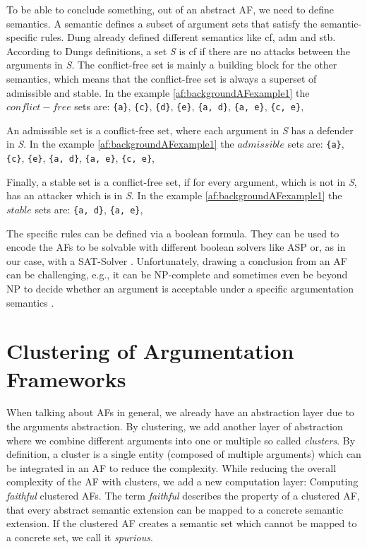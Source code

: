 To be able to conclude something, out of an abstract AF, we need to define semantics. A semantic defines a subset of argument sets that satisfy the semantic-specific rules. Dung already defined different semantics \cite{Dung1995-DUNOTA-2} like \ac{cf}, \ac{adm} and \ac{stb}. According to Dungs definitions, a set \textit{S} is \ac{cf} if there are no attacks between the arguments in \textit{S}. The conflict-free set is mainly a building block for the other semantics, which means that the conflict-free set is always a superset of admissible and stable. In the example \ref{af:backgroundAFexample1} the $conflict-free$ sets are:
\texttt{\{a\}},
\texttt{\{c\}},
\texttt{\{d\}},
\texttt{\{e\}},
\texttt{\{a, d\}},
\texttt{\{a, e\}},
\texttt{\{c, e\}},


An admissible set is a conflict-free set, where each argument in \textit{S} has a defender in \textit{S}. In the example \ref{af:backgroundAFexample1} the $admissible$ sets are:
\texttt{\{a\}},
\texttt{\{c\}},
\texttt{\{e\}},
\texttt{\{a, d\}},
\texttt{\{a, e\}},
\texttt{\{c, e\}},

Finally, a stable set is a conflict-free set, if for every argument, which is not in \textit{S}, has an attacker which is in \textit{S}. In the example \ref{af:backgroundAFexample1} the $stable$ sets are:
\texttt{\{a, d\}},
\texttt{\{a, e\}},


The specific rules can be defined via a boolean formula. They can be used to encode the \acp{AF} to be solvable with different boolean solvers like \ac{ASP} \cite{DBLP:journals/corr/abs-1301-1388} or, as in our case, with a \ac{SAT-Solver} \cite{DBLP:journals/amai/AmgoudD13}. Unfortunately, drawing a conclusion from an AF can be challenging, e.g., it can be NP-complete and sometimes even be beyond NP to decide whether an argument is acceptable under a specific argumentation semantics \cite{DBLP:journals/ai/DvorakGRW23}.



\section{Clustering of Argumentation Frameworks}

When talking about AFs in general, we already have an abstraction layer due to the arguments abstraction. By clustering, we add another layer of abstraction where we combine different arguments into one or multiple so called \textit{clusters}. By definition, a cluster is a single entity (composed of multiple arguments) which can be integrated in an AF to reduce the complexity. While reducing the overall complexity of the AF with clusters, we add a new computation layer: Computing \textit{faithful} clustered AFs. The term \textit{faithful} describes the property of a clustered AF, that every abstract semantic extension can be mapped to a concrete semantic extension. If the clustered AF creates a semantic set which cannot be mapped to a concrete set, we call it \textit{spurious}. 


